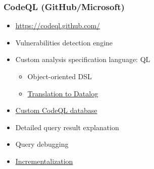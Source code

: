 \documentclass[xcolor=table,aspectratio=169]{beamer}
\begin{document}
\begin{frame}[fragile]
  \frametitle{CodeQL (GitHub/Microsoft)}
  \begin{minipage}[t]{0.51\textwidth}
  \begin{itemize}
    \item \url{https://codeql.github.com/}
    \item Vulnerabilities detection engine
    \item Custom analysis specification language: QL
    \begin{itemize}
      \item Object-oriented DSL
      \item \href{https://codeql.github.com/docs/codeql-overview/codeql-glossary/#dil}{Translation to Datalog}
    \end{itemize} 
    \item \href{https://codeql.github.com/docs/codeql-overview/codeql-glossary/#codeql-database}{Custom CodeQL database}
  \end{itemize}
\end{minipage}
\pause
\begin{minipage}[t]{0.48\textwidth}
  \begin{itemize}
    \item[\faPlus] Detailed query result explanation
    \item[\faMinus] Query debugging
    \item[\faMinus] \href{https://github.com/github/codeql-cli-binaries/issues/49}{Incrementalization}
  \end{itemize}
\end{minipage}
\end{frame}
\end{document}

